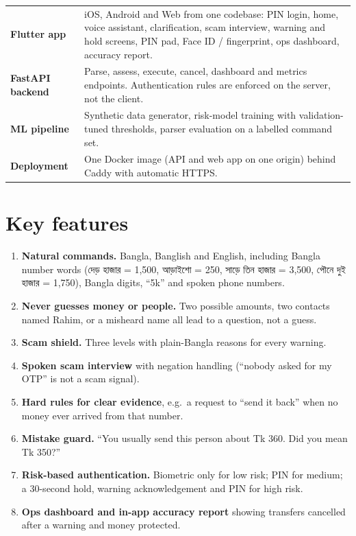 \documentclass[11pt,a4paper]{article}
\newcommand{\bn}[1]{{\bnfont #1}}
\begin{document}
\begin{tabularx}{\textwidth}{@{}>{\bfseries}p{30mm} X@{}}
\toprule
Flutter app & iOS, Android and Web from one codebase: PIN login, home, voice assistant, clarification, scam interview, warning and hold screens, PIN pad, Face ID / fingerprint, ops dashboard, accuracy report.\\
FastAPI backend & Parse, assess, execute, cancel, dashboard and metrics endpoints. Authentication rules are enforced on the server, not the client.\\
ML pipeline & Synthetic data generator, risk-model training with validation-tuned thresholds, parser evaluation on a labelled command set.\\
Deployment & One Docker image (API and web app on one origin) behind Caddy with automatic HTTPS.\\
\bottomrule
\end{tabularx}



\clearpage
\section{Key features}

\begin{enumerate}
  \item \textbf{Natural commands.} Bangla, Banglish and English, including Bangla number words (\bn{দেড় হাজার} = 1,500, \bn{আড়াইশো} = 250, \bn{সাড়ে তিন হাজার} = 3,500, \bn{পৌনে দুই হাজার} = 1,750), Bangla digits, ``5k'' and spoken phone numbers.
  \item \textbf{Never guesses money or people.} Two possible amounts, two contacts named Rahim, or a misheard name all lead to a question, not a guess.
  \item \textbf{Scam shield.} Three levels with plain-Bangla reasons for every warning.
  \item \textbf{Spoken scam interview} with negation handling (``nobody asked for my OTP'' is not a scam signal).
  \item \textbf{Hard rules for clear evidence}, e.g.\ a request to ``send it back'' when no money ever arrived from that number.
  \item \textbf{Mistake guard.} ``You usually send this person about Tk 360. Did you mean Tk 350?''
  \item \textbf{Risk-based authentication.} Biometric only for low risk; PIN for medium; a 30-second hold, warning acknowledgement and PIN for high risk.
  \item \textbf{Ops dashboard and in-app accuracy report} showing transfers cancelled after a warning and money protected.
\end{enumerate}
\end{document}
